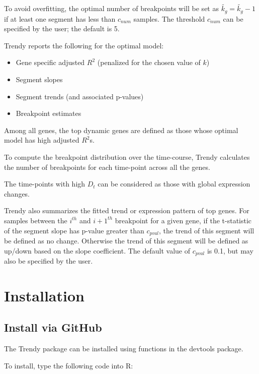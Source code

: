 \documentclass{article}
\begin{document}
To avoid overfitting, the optimal number of breakpoints will be set as
$\tilde{k_g} = \tilde{k_g} -1$ if at least one segment has less than 
$c_{num}$ samples. The threshold $c_{num}$ can be specified by the user; the
default is 5.


Trendy reports the following for the optimal model:
\begin{itemize}
  \item Gene specific adjusted $R^2$ (penalized for the chosen value of $k$)
  \item Segment slopes
  \item Segment trends (and associated p-values)
  \item Breakpoint estimates
\end{itemize}

Among all genes, the top dynamic genes are defined as those whose optimal
model has high adjusted $R^2$s.

To compute the breakpoint distribution over the time-course, Trendy calculates
the number of breakpoints for each time-point across all the genes.

The time-points with high $D_t$ can be considered as those with global
expression changes.

Trendy also summarizes the fitted trend or expression pattern of top genes. 
For samples between the $i^{th}$
and $i+1 ^{th}$ breakpoint for a given gene, if the t-statistic of
the segment slope has p-value greater than $c_{pval}$,
the trend of this segment will be defined as no change. Otherwise the
trend of this segment will be defined as up/down based on the 
slope coefficient.
The default value of $c_{pval}$ is 0.1, but may also be specified by the user.

\section{Installation}

\subsection{Install via GitHub}

The Trendy package can be installed using functions in the devtools package.

To install, type the following code into R:
\begin{knitrout}
\color{fgcolor}\begin{kframe}
\begin{alltt}
\end{alltt}
\end{kframe}
\end{knitrout}
\end{document}
